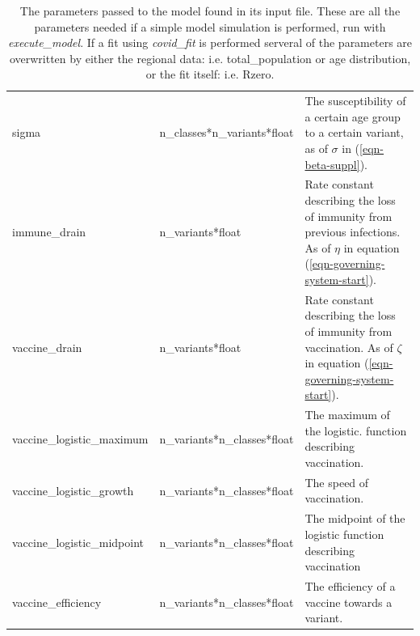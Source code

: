 \documentclass[a4paper,12pt]{article}
\begin{document}
\begin{table}
\begin{tiny}
\begin{tabular}{l|l|p{6cm}}
    sigma & n\_classes*n\_variants*float & The susceptibility of a
    certain age group to a certain variant, as of $\sigma$ in
    (\ref{eqn-beta-suppl}).\\
    immune\_drain & n\_variants*float & Rate constant describing the
    loss of immunity from previous infections. As of $\eta$ in equation
    (\ref{eqn-governing-system-start}). \\
    vaccine\_drain & n\_variants*float & Rate constant describing the
    loss of immunity from vaccination. As of $\zeta$ in equation
    (\ref{eqn-governing-system-start}). \\
    vaccine\_logistic\_maximum & n\_variants*n\_classes*float & The
    maximum of the logistic. 
    function describing vaccination. \\
    vaccine\_logistic\_growth & n\_variants*n\_classes*float & The
    speed of vaccination. \\ 
    vaccine\_logistic\_midpoint & n\_variants*n\_classes*float & The
    midpoint of the logistic function describing vaccination \\
    vaccine\_efficiency & n\_variants*n\_classes*float & The
    efficiency of a vaccine towards a variant.
  \end{tabular}
  \end{tiny}
  \caption{The parameters passed to the model found in its input
    file. These are all the parameters needed if a simple model
    simulation is performed, run with \emph{execute\_model}. If a fit
    using \emph{covid\_fit}
    is performed serveral of the parameters are overwritten by either
    the regional data: i.e. total\_population or age distribution, or
    the fit itself: i.e. Rzero.}
  \label{tab-gen-input-parameters}
\end{table}
\end{document}
